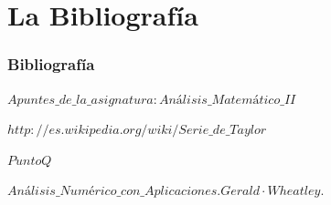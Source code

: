 \documentclass{beamer}
\begin{document}
\section{La Bibliografía}
\begin{frame}
\frametitle{Bibliografía}
\begin{thebibliography}

  \beamertermplatebookbibitems
  {\small $Apuntes\_de\_la\_asignatura: Análisis\_Matemático\_II$}
  
  \beamertermplatebookbibitems
  {\small $http://es.wikipedia.org/wiki/Serie\_de\_Taylor$}
  
  
  \beamertermplatebookbibitems
  {\small $PuntoQ$}
  

  \beamertermplatebookbibitems
  {\small $Análisis\_Numérico\_con\_Aplicaciones. Gerald·Wheatley.$}
  
\end{thebibliography}
\end{frame}
\end{document}
